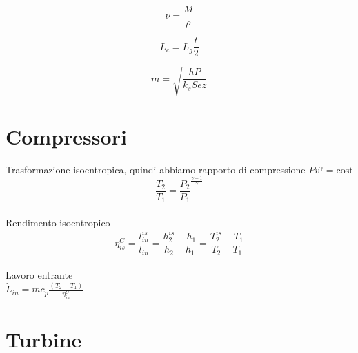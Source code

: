 \documentclass[portrait,a4paper]{article}
\begin{document}
\begin{multicols}{3}
\[\nu = \frac {M}{\rho} \]

\[L_{c} = L_{g} \frac {t}{2} \]

\[ m = \sqrt{
	\frac{hP}{k_s Sez}
}
\]









\section{Compressori}
Trasformazione isoentropica, quindi abbiamo rapporto di compressione
\(Pv^\gamma = \text{cost}\) \\
\[\frac{T_2}{T_1}=\frac{P_2}{P_1}^{\frac{\gamma -1}{\gamma}} \] \\
Rendimento isoentropico \\
\[ \eta_{is}^C = \frac{l_{in}^{is}}{l_{in}} = \frac{h_{2}^{is} - h_1}{h_2 - h_1} =  \frac{T_{2}^{is} - T_1}{T_2 - T_1}\] \\
Lavoro entrante \\
\( \dot L_{in} = \dot m c_p \frac{(T_2 - T_1)}{\eta_{is}^C} \)


\section{Turbine}



\end{multicols}
\end{document}
